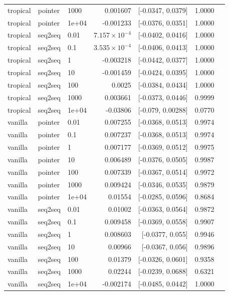 \documentclass[10pt]{article}
\begin{document}
{\begin{longtable}{lllrrrl}
tropical & pointer & 1000 & 0.001607 & [-0.0347, 0.0379] & 1.0000 & \\
tropical & pointer & 1e+04 & -0.001233 & [-0.0376, 0.0351] & 1.0000 & \\
tropical & seq2seq & 0.01 & $7.157\times10^{-4}$ & [-0.0402, 0.0416] & 1.0000 & \\
tropical & seq2seq & 0.1 & $3.535\times10^{-4}$ & [-0.0406, 0.0413] & 1.0000 & \\
tropical & seq2seq & 1 & -0.003218 & [-0.0442, 0.0377] & 1.0000 & \\
tropical & seq2seq & 10 & -0.001459 & [-0.0424, 0.0395] & 1.0000 & \\
tropical & seq2seq & 100 & 0.0025 & [-0.0384, 0.0434] & 1.0000 & \\
tropical & seq2seq & 1000 & 0.003661 & [-0.0373, 0.0446] & 0.9999 & \\
tropical & seq2seq & 1e+04 & -0.03806 & [-0.079, 0.00288] & 0.0770 & \\
vanilla & pointer & 0.01 & 0.007255 & [-0.0368, 0.0513] & 0.9974 & \\
vanilla & pointer & 0.1 & 0.007237 & [-0.0368, 0.0513] & 0.9974 & \\
vanilla & pointer & 1 & 0.007177 & [-0.0369, 0.0512] & 0.9975 & \\
vanilla & pointer & 10 & 0.006489 & [-0.0376, 0.0505] & 0.9987 & \\
vanilla & pointer & 100 & 0.007339 & [-0.0367, 0.0514] & 0.9972 & \\
vanilla & pointer & 1000 & 0.009424 & [-0.0346, 0.0535] & 0.9879 & \\
vanilla & pointer & 1e+04 & 0.01554 & [-0.0285, 0.0596] & 0.8684 & \\
vanilla & seq2seq & 0.01 & 0.01002 & [-0.0363, 0.0564] & 0.9872 & \\
vanilla & seq2seq & 0.1 & 0.009458 & [-0.0369, 0.0558] & 0.9907 & \\
vanilla & seq2seq & 1 & 0.008603 & [-0.0377, 0.055] & 0.9946 & \\
vanilla & seq2seq & 10 & 0.00966 & [-0.0367, 0.056] & 0.9896 & \\
vanilla & seq2seq & 100 & 0.01379 & [-0.0326, 0.0601] & 0.9358 & \\
vanilla & seq2seq & 1000 & 0.02244 & [-0.0239, 0.0688] & 0.6321 & \\
vanilla & seq2seq & 1e+04 & -0.002174 & [-0.0485, 0.0442] & 1.0000 & \\
\bottomrule
\end{longtable}
}
\end{document}
